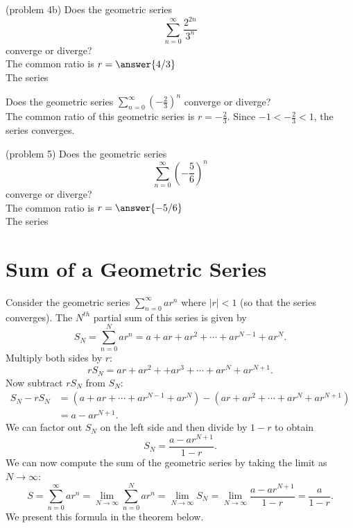 \documentclass{ximera}
\begin{document}
 
 \begin{problem}(problem 4b)
 Does the geometric series
 \[
 \sum_{n=0}^\infty \frac{2^{2n}}{3^n} 
 \]
 converge or diverge?\\
 The common ratio is $r = \answer{4/3}$\\
 The series
 \begin{multipleChoice}
 \end{multipleChoice}
 \end{problem}
 

\begin{example}[example 5]
Does the geometric series $\displaystyle{\sum_{n=0}^\infty \left(-\frac23\right)^n }$ converge or diverge?\\
The common ratio of this geometric series is $r = -\frac23$. Since $-1 < -\frac23 < 1$,
the series converges.
\end{example}

\begin{problem}(problem 5)
 Does the geometric series
 \[
 \sum_{n=0}^\infty \left(-\frac56 \right)^n
 \]
 converge or diverge?\\
 The common ratio is $r = \answer{-5/6}$\\
 The series
 \begin{multipleChoice}
 \end{multipleChoice}
 \end{problem}

\section{Sum of a Geometric Series}

Consider the geometric series $\sum_{n=0}^\infty ar^n$ where $|r| < 1$ (so that the series converges).
The $N^{th}$ partial sum of this series is given by
\[
S_N = \sum_{n=0}^N ar^n = a + ar + ar^2 + \cdots + ar^{N-1} + ar^N.
\]
Multiply both sides by $r$:
\[
rS_N =  ar + ar^2 + + ar^3 + \cdots  + ar^N + ar^{N+1}.
\] 
Now subtract $rS_N$ from $S_N$:
\begin{align*}
S_N - rS_N &= \left(a + ar + \cdots + ar^{N-1} + ar^N\right) - \left(ar + ar^2 + \cdots  + ar^N + ar^{N+1} \right)\\
           &= a - ar^{N+1}.
\end{align*}
We can factor out $S_N$ on the left side and then divide by $1-r$ to obtain
\[
S_N = \frac{a - ar^{N+1}}{1-r}.
\]
We can now compute the sum of the geometric series by taking the limit as $N \to \infty$:
\[
S = \sum_{n=0}^\infty ar^n = \lim_{N \to \infty} \sum_{n=0}^N ar^n = \lim_{N \to \infty} S_N = \lim_{N \to \infty} \frac{a - ar^{N+1}}{1-r} = \frac{a}{1-r}.
\]
We present this formula in the theorem below.
\end{document}
